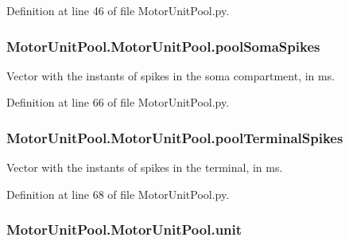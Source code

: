 Definition at line 46 of file Motor\+Unit\+Pool.\+py.

\subsubsection[{\texorpdfstring{pool\+Soma\+Spikes}{poolSomaSpikes}}]{\setlength{\rightskip}{0pt plus 5cm}Motor\+Unit\+Pool.\+Motor\+Unit\+Pool.\+pool\+Soma\+Spikes}\hypertarget{class_motor_unit_pool_1_1_motor_unit_pool_a3790757a111061662ad0f98120b25e69}{}\label{class_motor_unit_pool_1_1_motor_unit_pool_a3790757a111061662ad0f98120b25e69}


Vector with the instants of spikes in the soma compartment, in ms. 



Definition at line 66 of file Motor\+Unit\+Pool.\+py.

\subsubsection[{\texorpdfstring{pool\+Terminal\+Spikes}{poolTerminalSpikes}}]{\setlength{\rightskip}{0pt plus 5cm}Motor\+Unit\+Pool.\+Motor\+Unit\+Pool.\+pool\+Terminal\+Spikes}\hypertarget{class_motor_unit_pool_1_1_motor_unit_pool_a4f0b93df27eb6303fa1a3d49653d4fd3}{}\label{class_motor_unit_pool_1_1_motor_unit_pool_a4f0b93df27eb6303fa1a3d49653d4fd3}


Vector with the instants of spikes in the terminal, in ms. 



Definition at line 68 of file Motor\+Unit\+Pool.\+py.

\subsubsection[{\texorpdfstring{unit}{unit}}]{\setlength{\rightskip}{0pt plus 5cm}Motor\+Unit\+Pool.\+Motor\+Unit\+Pool.\+unit}\hypertarget{class_motor_unit_pool_1_1_motor_unit_pool_a1b14c831606c27efae62f1468850393b}{}\label{class_motor_unit_pool_1_1_motor_unit_pool_a1b14c831606c27efae62f1468850393b}


